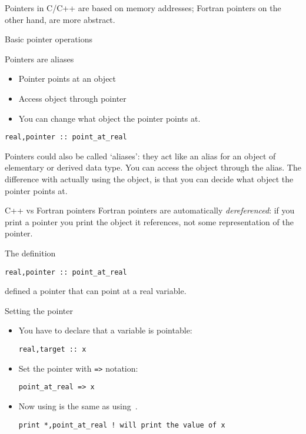 
Pointers in C/C++ are based on memory addresses; 
Fortran pointers on the other hand, are more
abstract.

 {Basic pointer operations}

\begin{block}{Pointers are aliases}
  \label{sl:fpoint}
  \begin{itemize}
  \item Pointer points at an object
  \item Access object through pointer
  \item You can change what object the pointer points at.
  \end{itemize}
\begin{verbatim}
real,pointer :: point_at_real
\end{verbatim}
\end{block}

Pointers could also be called `aliases': they act like an alias for an
object of elementary or derived data type. You can access the object
through the alias. The difference with actually using the object, is
that you can decide what object the pointer points at.

\begin{block}{C++ vs Fortran pointers}
  \label{sl:cpoint-vs-fpoint}
  Fortran pointers are automatically
  \emph{dereferenced}: if you print a
  pointer you print the object it references, not some representation
  of the pointer.
\end{block}

The  definition
\begin{verbatim}
real,pointer :: point_at_real
\end{verbatim}
defined a pointer that can point at a real variable.

\begin{block}{Setting the pointer}
  \label{sl:fpoint-set}
  \begin{itemize}
  \item You have to declare that a variable is pointable:
\begin{verbatim}
real,target :: x
\end{verbatim}
\item Set the pointer with \verb+=>+ notation:
\begin{verbatim}
point_at_real => x
\end{verbatim}
\item Now using  is the same as using~.
\begin{verbatim}
print *,point_at_real ! will print the value of x
\end{verbatim}
  \end{itemize}
\end{block}

